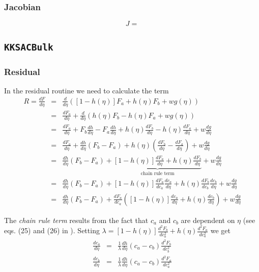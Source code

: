 \documentclass[]{article}
\begin{document}
\subsubsection{Jacobian}
\[
J=
\]






\subsection{\texttt{KKSACBulk}}

\subsubsection{Residual}

In the residual routine we need to calculate the term 
\begin{eqnarray*}
R=\frac{dF}{d\eta}&=&\frac{d}{d\eta}\left([1-h(\eta)]F_a + h(\eta)F_b+wg(\eta) \right)\\
&=& \frac{dF_a}{d\eta}+\frac{d}{d\eta}\left(h(\eta)F_b-h(\eta)F_a + wg(\eta)\right)\\
&=& \frac{dF_a}{d\eta}+F_b\frac{dh}{d\eta}-F_a\frac{dh}{d\eta}+h(\eta)\frac{dF_b}{d\eta}-h(\eta)\frac{dF_a}{d\eta} +w\frac{dg}{d\eta}\\
&=& \frac{dF_a}{d\eta}+\frac{dh}{d\eta}(F_b-F_a)+h(\eta)\left(\frac{dF_b}{d\eta}-\frac{dF_a}{d\eta}\right) +w\frac{dg}{d\eta}\\
&=& \frac{dh}{d\eta}(F_b-F_a) + \underbrace{[1-h(\eta)]\frac{dF_a}{d\eta} + h(\eta)\frac{dF_b}{d\eta}}_{\text{chain rule term}} +w\frac{dg}{d\eta}\\
&=& \frac{dh}{d\eta}(F_b-F_a) + [1-h(\eta)]\frac{dF_a}{dc_a}\frac{dc_a}{d\eta} + h(\eta)\frac{dF_b}{dc_b}\frac{dc_b}{d\eta} +w\frac{dg}{d\eta}\\
&=& \frac{dh}{d\eta}(F_b-F_a) + \frac{dF_a}{dc_a}\left([1-h(\eta)]\frac{dc_a}{d\eta} + h(\eta)\frac{dc_b}{d\eta}\right) +w\frac{dg}{d\eta}
\end{eqnarray*}

The \emph{chain rule term} results from the fact that $c_a$ and $c_b$ are dependent on $\eta$ (see eqs. (25) and (26) in \cite{KKS}).
Setting $\lambda = [1-h(\eta)]\frac{d^2F_b}{dc_b^2}+h(\eta)\frac{d^2F_a}{dc_a^2}$ we get
\begin{eqnarray*}
\frac{dc_a}{d\eta} &=& \frac1\lambda \frac{dh}{d\eta}(c_a-c_b)\frac{d^2F_b}{dc_b^2}\\
\frac{dc_b}{d\eta} &=& \frac1\lambda \frac{dh}{d\eta}(c_a-c_b)\frac{d^2F_a}{dc_a^2}
\end{eqnarray*}
\end{document}
